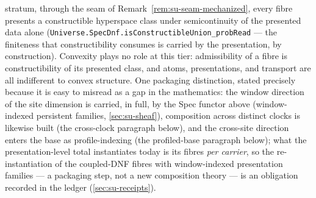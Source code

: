 stratum, through the seam of Remark~\ref{rem:su-seam-mechanized},
every fibre presents a constructible hyperspace class under
semicontinuity of the presented data alone
(\texttt{Universe.SpecDnf.isConstructibleUnion\_probRead} --- the
finiteness that constructibility consumes is carried by the
presentation, by construction). Convexity plays no role at this
tier: admissibility of a fibre is constructibility of its presented
class, and atoms, presentations, and transport are all indifferent
to convex structure. One packaging distinction, stated precisely
because it is easy to misread as a gap in the mathematics: the
window direction of the site dimension is carried, in full, by the
Spec functor above (window-indexed persistent families,
\autoref{sec:su-sheaf}), composition across distinct clocks is
likewise built (the cross-clock paragraph below), and the
cross-site direction enters the base as profile-indexing (the
profiled-base paragraph below); what the
presentation-level total instantiates today is its fibres
\emph{per carrier}, so the re-instantiation of the coupled-DNF
fibres with window-indexed presentation families --- a packaging
step, not a new composition theory --- is an obligation recorded in
the ledger (\autoref{sec:su-receipts}).

